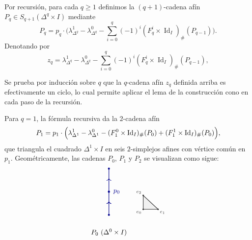 \begin{dem}
Por recursión, para cada $q \geq 1$ definimos la $(q+1)$-cadena afín $P_q \in S_{q+1}(\Delta^q \times I)$ mediante
\[
P_q = p_q \cdot \bigg(\lambda_{\Delta^q}^1 - \lambda_{\Delta^q}^0 - \sum_{i=0}^q (-1)^i (F_q^i \times \operatorname{Id}_I)_\#(P_{q-1})\bigg).
\]
Denotando por
\[
z_q = \lambda_{\Delta^q}^1 - \lambda_{\Delta^q}^0 - \sum_{i=0}^q (-1)^i (F_q^i \times \operatorname{Id}_I)_\#(P_{q-1}),
\]
\begin{nota}
Se prueba por inducción sobre $q$ que la $q$-cadena afín $z_q$ definida arriba es efectivamente un ciclo, lo cual permite aplicar el lema de la construcción cono en cada paso de la recursión.
\end{nota}



\begin{ejemplo}
Para $q = 1$, la fórmula recursiva da la $2$-cadena afín
\[
P_1 = p_1 \cdot \Bigl(\lambda_{\Delta^1}^1 - \lambda_{\Delta^1}^0 - (F_1^0 \times \operatorname{Id}_I)_\#(P_0) + (F_1^1 \times \operatorname{Id}_I)_\#(P_0)\Bigr),
\]
que triangula el cuadrado $\Delta^1 \times I$ en seis $2$-simplejos afines con vértice común en $p_1$. Geométricamente, las cadenas $P_0$, $P_1$ y $P_2$ se visualizan como sigue:
\[
\begin{tikzpicture}[baseline=(current bounding box.center), scale=0.95]
    \coordinate (B0) at (0.4, 0.0);
    \coordinate (M0) at (0.4, 1.25);
    \coordinate (T0) at (0.4, 2.5);

    \draw[->, thick, blue!55!black] (B0) -- (0.4, 0.72);
    \draw[thick, blue!55!black] (0.4, 0.65) -- (M0);
    \draw[->, thick, blue!55!black] (M0) -- (0.4, 1.97);
    \draw[thick, blue!55!black] (0.4, 1.90) -- (T0);

    \fill[blue!55!black] (B0) circle (1.5pt);
    \fill[blue!55!black] (M0) circle (1.6pt) node[right=3pt] {$p_0$};
    \fill[blue!55!black] (T0) circle (1.5pt);

    \node at (0.4, -0.95) {$P_0$ ($\Delta^0 \times I$)};

    \coordinate (D0) at (2.25, 0.30);
    \coordinate (D1) at (3.05, 0.30);
    \coordinate (D2) at (2.25, 1.05);

    \fill[gray!12] (D0) -- (D1) -- (D2) -- cycle;
    \draw[thick, black!80] (D0) -- (D1) -- (D2) -- cycle;
    \fill[black!80] (D0) circle (1.2pt) node[below left=-1pt] {\scriptsize $e_0$};
    \fill[black!80] (D1) circle (1.2pt) node[below right=-1pt] {\scriptsize $e_1$};
    \fill[black!80] (D2) circle (1.2pt) node[above left=-1pt] {\scriptsize $e_2$};


\end{tikzpicture}\]
\end{ejemplo}
\end{dem}
